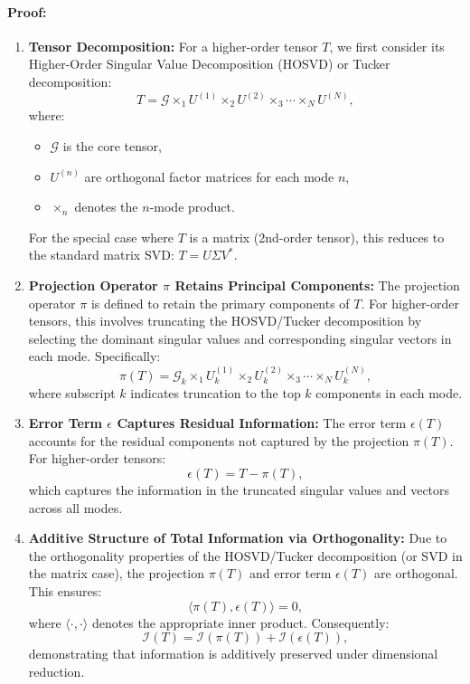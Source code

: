 \documentclass[sn-mathphys-num]{sn-jnl}
\theoremstyle{thmstyleone}
\theoremstyle{thmstyletwo}
\theoremstyle{thmstylethree}
\begin{document}
\paragraph{Proof:} 
\begin{enumerate}
    \item \textbf{Tensor Decomposition:} 
    For a higher-order tensor $T$, we first consider its Higher-Order Singular Value Decomposition (HOSVD) or Tucker decomposition:
    \[
    T = \mathcal{G} \times_1 U^{(1)} \times_2 U^{(2)} \times_3 \cdots \times_N U^{(N)},
    \]
    where:
    \begin{itemize}
        \item $\mathcal{G}$ is the core tensor,
        \item $U^{(n)}$ are orthogonal factor matrices for each mode $n$,
        \item $\times_n$ denotes the $n$-mode product.
    \end{itemize}
    
    For the special case where $T$ is a matrix (2nd-order tensor), this reduces to the standard matrix SVD:
    $T = U \Sigma V^*$.
    
    \item \textbf{Projection Operator $\pi$ Retains Principal Components:} 
    The projection operator $\pi$ is defined to retain the primary components of $T$. For higher-order tensors, this involves truncating the HOSVD/Tucker decomposition by selecting the dominant singular values and corresponding singular vectors in each mode. Specifically:
    \[
    \pi(T) = \mathcal{G}_k \times_1 U^{(1)}_k \times_2 U^{(2)}_k \times_3 \cdots \times_N U^{(N)}_k,
    \]
    where subscript $k$ indicates truncation to the top $k$ components in each mode.

    \item \textbf{Error Term $\epsilon$ Captures Residual Information:} 
    The error term $\epsilon(T)$ accounts for the residual components not captured by the projection $\pi(T)$. For higher-order tensors:
    \[
    \epsilon(T) = T - \pi(T),
    \]
    which captures the information in the truncated singular values and vectors across all modes.

    \item \textbf{Additive Structure of Total Information via Orthogonality:} 
    Due to the orthogonality properties of the HOSVD/Tucker decomposition (or SVD in the matrix case), the projection $\pi(T)$ and error term $\epsilon(T)$ are orthogonal. This ensures:
    \[
    \langle \pi(T), \epsilon(T) \rangle = 0,
    \]
    where $\langle \cdot, \cdot \rangle$ denotes the appropriate inner product. Consequently:
    \[
    \mathcal{I}(T) = \mathcal{I}(\pi(T)) + \mathcal{I}(\epsilon(T)),
    \]
    demonstrating that information is additively preserved under dimensional reduction.
\end{enumerate}
\end{document}

